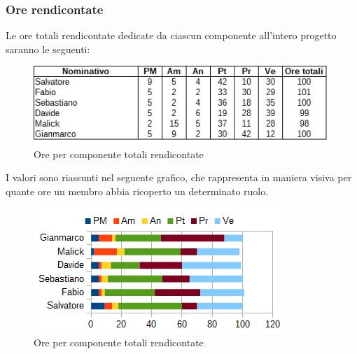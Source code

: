 		\subsubsection{Ore rendicontate}
		Le ore totali rendicontate dedicate da ciascun componente all'intero progetto saranno le seguenti: \\
		\begin{figure}[H]
			\centering
			\includegraphics[scale=0.75]{immagini/tabelle/orario_rendicontato.png}
			\caption{Ore per componente totali rendicontate}
		\end{figure}
		I valori sono riassunti nel seguente grafico, che rappresenta in maniera visiva per quante ore un membro abbia ricoperto un determinato ruolo. \\
		\begin{figure}[H]
			\centering
			\includegraphics[scale=1]{immagini/grafici/orario_rendicontato-barra.png}
			\caption{Ore per componente totali rendicontate}
		\end{figure}